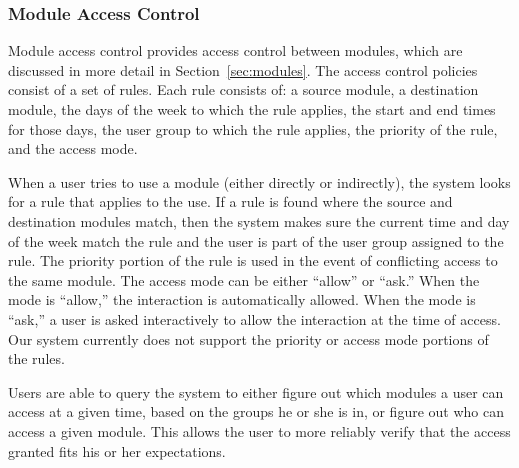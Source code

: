 \subsubsection{Module Access Control}
Module access control provides access control between modules, which are
discussed in more detail in Section~\ref{sec:modules}. The access control
policies consist of a set of rules. Each rule consists of: a source module, a
destination module, the days of the week to which the rule applies, the start
and end times for those days, the user group to which the rule applies, the
priority of the rule, and the access mode.

When a user tries to use a module (either directly or indirectly), the system
looks for a rule that applies to the use. If a rule is found where the source
and destination modules match, then the system makes sure the current time and
day of the week match the rule and the user is part of the user group assigned
to the rule. The priority portion of the rule is used in the event of
conflicting access to the same module. The access mode can be either ``allow''
or ``ask.'' When the mode is ``allow,'' the interaction is automatically
allowed. When the mode is ``ask,'' a user is asked interactively to allow the
interaction at the time of access. Our system currently does not support the
priority or access mode portions of the rules.

Users are able to query the system to either figure out which modules a user can
access at a given time, based on the groups he or she is in, or figure out who
can access a given module. This allows the user to more reliably verify that the
access granted fits his or her expectations.
